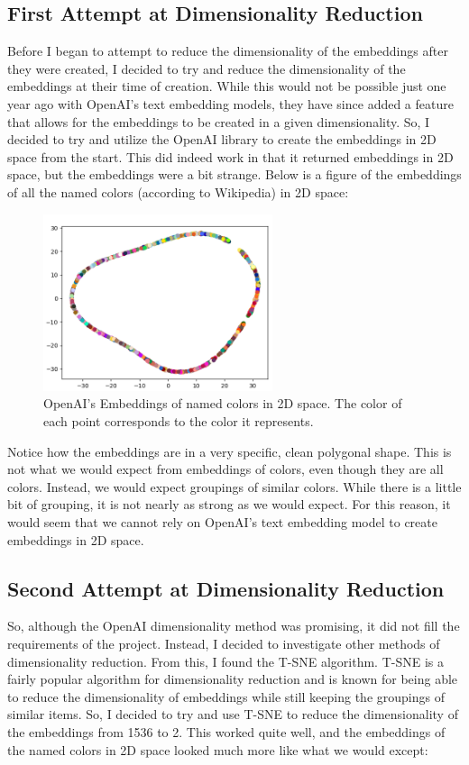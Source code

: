 \documentclass{article}
\begin{document}
\subsection{First Attempt at Dimensionality Reduction}
Before I began to attempt to reduce the dimensionality of the embeddings 
after they were created, I decided to try and reduce the dimensionality 
of the embeddings at their time of creation. While this would not be possible
just one year ago with OpenAI's text embedding models, they have since added
a feature that allows for the embeddings to be created in a given dimensionality.
So, I decided to try and utilize the OpenAI library to create the embeddings in 
2D space from the start. This did indeed work in that it returned embeddings in 2D space,
but the embeddings were a bit strange. Below is a figure of the embeddings of all the named
colors (according to Wikipedia) in 2D space:

\begin{figure}[H]
\centering
\includegraphics[width=0.6\textwidth]{images/openai_2d_embeddings.png}
\caption{OpenAI's Embeddings of named colors in 2D space. The color of each point corresponds to the color it represents.}
\label{fig:openai2dembeddings}
\end{figure}

\noindent
Notice how the embeddings are in a very specific, clean polygonal shape. This is not what we would expect from embeddings
of colors, even though they are all colors. Instead, we would expect groupings of similar colors. While there is a little
bit of grouping, it is not nearly as strong as we would expect. For this reason, it would seem that we cannot rely on
OpenAI's text embedding model to create embeddings in 2D space.
\newline

\subsection{Second Attempt at Dimensionality Reduction}
So, although the OpenAI dimensionality method was promising, it did not fill the requirements
of the project. Instead, I decided to investigate other methods of dimensionality reduction.
From this, I found the T-SNE algorithm. T-SNE is a fairly popular algorithm for dimensionality reduction
and is known for being able to reduce the dimensionality of embeddings while still keeping the
groupings of similar items. So, I decided to try and use T-SNE to reduce the dimensionality of the
embeddings from 1536 to 2. This worked quite well, and the embeddings of the named colors in 2D space
looked much more like what we would except:
\end{document}

